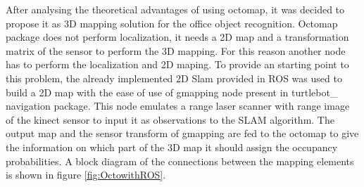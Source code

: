 \documentclass[fontsize=12pt]{article}
\begin{document}
After analysing the theoretical advantages of using octomap, it was decided to propose it as 3D mapping solution for the office object recognition. 
Octomap package does not perform localization, it needs a 2D map and a transformation matrix of the sensor to perform the 3D mapping. For this reason another node has to perform the localization and 2D maping. To provide an starting point to this problem, the already implemented 2D Slam provided in ROS was used to build a 2D map with the ease of use of gmapping node present in turtlebot\_ navigation package. This node emulates a range laser scanner with range image of the kinect sensor to input it as observations to the SLAM algorithm. The output map and the sensor transform of gmapping are fed to the octomap to give the information on which part of the 3D map it should assign the occupancy probabilities. A block diagram of the connections between the mapping elements is shown in figure \ref{fig:OctowithROS}.\\
\end{document}
